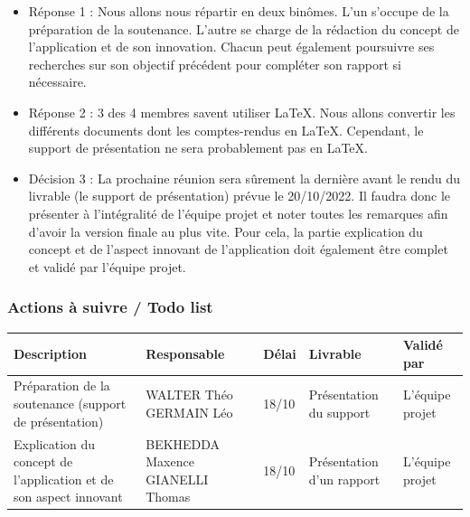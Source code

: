 \documentclass[11pt]{article}
\begin{document}
\begin{itemize}
	\item 

	Réponse 1 : Nous allons nous répartir en deux binômes. L’un s’occupe de la préparation de la soutenance. L’autre se charge de la rédaction du concept de l’application et de son innovation. Chacun peut également poursuivre ses recherches sur son objectif précédent pour compléter son rapport si nécessaire.
\item	Réponse 2 : 3 des 4 membres savent utiliser LaTeX. Nous allons convertir les différents documents dont les comptes-rendus en LaTeX. Cependant, le support de présentation ne sera probablement pas en LaTeX.
\item	Décision 3 : La prochaine réunion sera sûrement la dernière avant le rendu du livrable (le support de présentation) prévue le 20/10/2022. Il faudra donc le présenter à l’intégralité de l’équipe projet et noter toutes les remarques afin d’avoir la version finale au plus vite. Pour cela, la partie explication du concept et de l’aspect innovant de l’application doit également être complet et validé par l’équipe projet.

\end{itemize}
\vspace{0.5cm}


\subsubsection{Actions à suivre / Todo list}
\vspace{0.2cm}

\begin{center}
\begin{tabular}{|p{4cm}|p{4cm}|p{1cm}|p{3cm}|p{2cm}|}
\hline
\centering Description & 
\centering Responsable & 
\centering Délai & 
\centering Livrable & 
\hspace{0.05cm} Validé par\\
\hline
Préparation de la soutenance (support de présentation) & WALTER Théo \newline GERMAIN Léo & 18/10 & Présentation du support& L'équipe projet \\
\hline
Explication du concept de l'application et de son aspect innovant & BEKHEDDA Maxence GIANELLI Thomas & 18/10 & Présentation d'un rapport & L'équipe projet\\
\hline

	
\end{tabular}
\end{center}

\newpage
\nocite{*}


\end{document}
